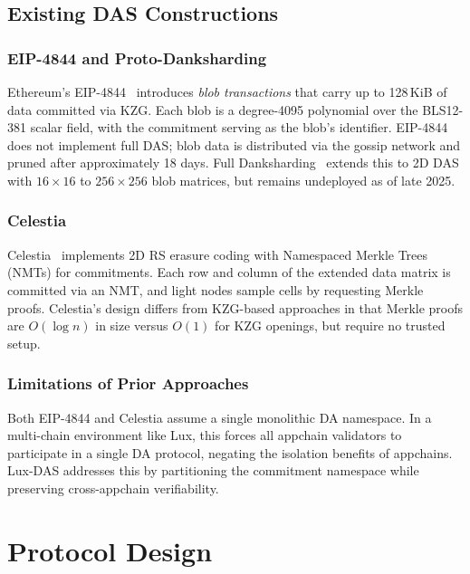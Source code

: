 \documentclass[11pt,a4paper]{article}
\theoremstyle{plain}
\theoremstyle{definition}
\theoremstyle{remark}
\begin{document}
\subsection{Existing DAS Constructions}

\subsubsection{EIP-4844 and Proto-Danksharding}

Ethereum's EIP-4844~\cite{eip4844} introduces \emph{blob transactions} that carry up to
128\,KiB of data committed via KZG. Each blob is a degree-4095 polynomial over the BLS12-381
scalar field, with the commitment serving as the blob's identifier. EIP-4844 does not implement
full DAS; blob data is distributed via the gossip network and pruned after approximately
18 days. Full Danksharding~\cite{dankrad2022danksharding} extends this to 2D DAS with
$16 \times 16$ to $256 \times 256$ blob matrices, but remains undeployed as of late 2025.

\subsubsection{Celestia}

Celestia~\cite{albassam2019lazyledger} implements 2D RS erasure coding with Namespaced Merkle
Trees (NMTs) for commitments. Each row and column of the extended data matrix is committed
via an NMT, and light nodes sample cells by requesting Merkle proofs. Celestia's design
differs from KZG-based approaches in that Merkle proofs are $O(\log n)$ in size versus
$O(1)$ for KZG openings, but require no trusted setup.

\subsubsection{Limitations of Prior Approaches}

Both EIP-4844 and Celestia assume a single monolithic DA namespace. In a multi-chain
environment like Lux, this forces all appchain validators to participate in a single DA
protocol, negating the isolation benefits of appchains. Lux-DAS addresses this by partitioning
the commitment namespace while preserving cross-appchain verifiability.


\section{Protocol Design}
\label{sec:protocol}
\end{document}
